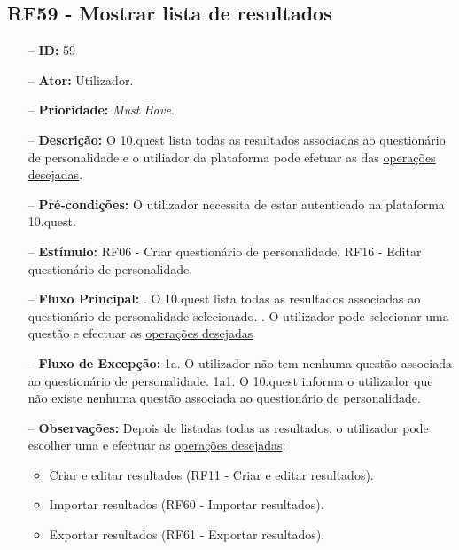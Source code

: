 \subsection{RF59 - Mostrar lista de resultados}
\begin{itemize}
	\item[--] \textbf{ID:} 59
	\item[--]  \textbf{Ator:} Utilizador.
	\item[--]  \textbf{Prioridade:} \textit{Must Have}.
	\item[--]  \textbf{Descrição:} O 10.quest lista todas as resultados associadas ao questionário de personalidade e o utiliador da plataforma pode efetuar as das \underline{operações desejadas}.
	\item[--]  \textbf{Pré-condições:} O utilizador necessita de estar autenticado na plataforma 10.quest.
	\item[--]  \textbf{Estímulo:} 
	\subitem RF06 - Criar questionário de personalidade.
	\subitem RF16 - Editar questionário de personalidade.
	\item[--]  \textbf{Fluxo Principal:} 
	. O 10.quest lista todas as resultados associadas ao questionário de personalidade selecionado.
	. O utilizador pode selecionar uma questão e efectuar as \underline{operações desejadas}
	\item[--]  \textbf{Fluxo de Excepção:} 
	\subitem 1a. O utilizador não tem nenhuma questão associada ao questionário de personalidade.
	\subitem 1a1. O 10.quest informa o utilizador que não existe nenhuma questão associada ao questionário de personalidade.
	\item[--]  \textbf{Observações:} Depois de listadas todas as resultados, o utilizador pode escolher uma e efectuar as \underline{operações desejadas}:
	\begin{itemize}
		\item Criar e editar resultados (RF11 - Criar e editar resultados).
		\item Importar resultados (RF60 - Importar resultados).
		\item Exportar resultados (RF61 - Exportar resultados).
	\end{itemize}
\end{itemize}
\newpage

